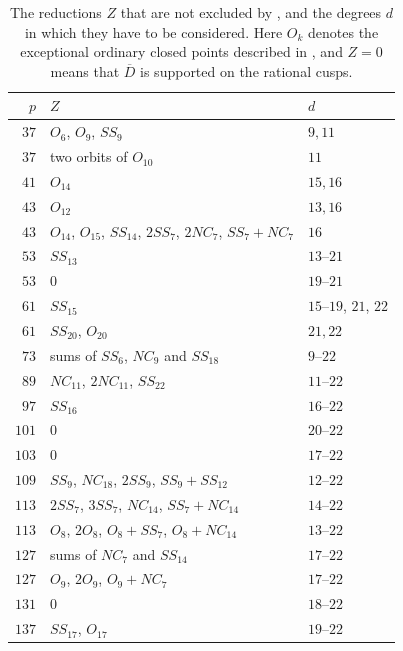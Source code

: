 \begin{table}[H]
\centering
\begin{tabular}{rll}
\toprule
$p$ & $Z$ & $d$\\
\midrule
$37$ & $O_6$, $O_9$, $SS_9$ & $9,11$\\
$37$ & two orbits of $O_{10}$ & $11$\\
$41$ & $O_{14}$ & $15,16$\\
$43$ & $O_{12}$ & $13,16$\\
$43$ & $O_{14}$, $O_{15}$, $SS_{14}$, $2SS_7$, $2NC_7$, $SS_7+NC_7$ & $16$\\
$53$ & $SS_{13}$ & $13$--$21$\\
$53$ & $0$ & $19$--$21$\\
$61$ & $SS_{15}$ & $15$--$19$, $21$, $22$\\
$61$ & $SS_{20}$, $O_{20}$ & $21,22$\\
$73$ & sums of $SS_6$, $NC_9$ and $SS_{18}$ & $9$--$22$\\
$89$ & $NC_{11}$, $2NC_{11}$, $SS_{22}$ & $11$--$22$\\
$97$ & $SS_{16}$ & $16$--$22$\\
$101$ & $0$ & $20$--$22$\\
$103$ & $0$ & $17$--$22$\\
$109$ & $SS_9$, $NC_{18}$, $2SS_9$, $SS_9+SS_{12}$ & $12$--$22$\\
$113$ & $2SS_7$, $3SS_7$, $NC_{14}$, $SS_7+NC_{14}$ & $14$--$22$\\
$113$ & $O_8$, $2O_8$, $O_8+SS_7$, $O_8+NC_{14}$ & $13$--$22$\\
$127$ & sums of $NC_7$ and $SS_{14}$ & $17$--$22$\\
$127$ & $O_9$, $2O_9$, $O_9+NC_7$ & $17$--$22$\\
$131$ & $0$ & $18$--$22$\\
$137$ & $SS_{17}$, $O_{17}$ & $19$--$22$\\
\bottomrule
\end{tabular}
\medskip
\caption{The reductions $Z$ that are not excluded by , and the degrees $d$ in which they have to be considered. Here $O_k$ denotes the exceptional ordinary closed points described in , and $Z=0$ means that $\overline D$ is supported on the rational cusps.}
\label{table:exceptions}
\end{table}
